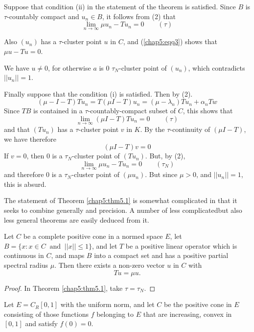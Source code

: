 Suppose that condition (ii) in the statement of the theorem  is
satisfied. Since $B$ is $\tau$-countably compact and $u_n \in B$, it
follows from (2) that 
\begin{equation}
  \lim_{n \to \infty} \mu u_n - Tu_n = 0 \qquad (\tau)
  \tag{3}\label{chap5:eqq3}
\end{equation}\pageoriginale

Also $(u_n)$ has a $\tau$-cluster point $u$ in $C$, and
(\ref{chap5:eqq3}) shows that $\mu u - Tu = 0$. 

We have $u \neq 0$, for otherwise $a$ is 0 $\tau_N$-cluster point of
$(u_n)$, which contradicts $|| u_n || = 1$. 

Finally suppose that the condition (i) is satisfied. Then by (2).
$$
(\mu - I - T) Tu_n = T(\mu I - T) u_n = (\mu - \lambda_n) Tu_n + \alpha_n Tw
$$ 
Since $TB$ is contained in a $\tau$-countably-compact subset of $C$,
this shows that 
$$
\lim_{n \to \infty} (\mu I - T) Tu_n = 0 \qquad (\tau)
$$
and that $(Tu_n)$ has a $\tau$-cluster point $v$ in $K$. By the
$\tau$-continuity of $(\mu I - T)$, we have therefore 
$$
(\mu I - T)v = 0
$$
If $v = 0$, then $0$ is a $\tau_N$-cluster point of $(Tu_n)$. But, by (2),
$$
\lim_{n \to \infty} \mu u_n - Tu_n = 0 \qquad (\tau_N)
$$
and therefore $0$ is a $\tau_N$-cluster point of $(\mu u_n)$. But
since $\mu > 0$, and $|| u_n || = 1$, this is absurd. 

The statement of Theorem \ref{chap5:thm5.1} is somewhat complicated in
that it seeks to combine generally and precision. A number of less
complicated\pageoriginale but also less general theorems are easily
deduced from it.   

\begin{thmm}\label{chap5:thm5.2}%
  Let $C$ be a complete positive cone in a normed space $E$, let $B =
  \{ x : x \in C ~ \text{ and } ~ || x || \le 1\}$, and let $T$ be a
  positive linear operator which is continuous in $C$, and maps $B$
  into a compact set and has a positive partial spectral radius
  $\mu$. Then there exists a non-zero vector $u$ in $C$ with 
  $$
  Tu = \mu u.
  $$
\end{thmm}

\begin{proof}
In Theorem \ref{chap5:thm5.1}, take $\tau = \tau_N$.
\end{proof}

\begin{exam} %
  Let $E = C_R [0, 1]$ with the uniform norm, and let $C$ be the
  positive cone in $E$ consisting of those functions $f$ belonging to
  $E$ that are increasing, convex in $[0, 1]$ and satisfy $f(0) = 0
  $. 
\end{exam} 
 
